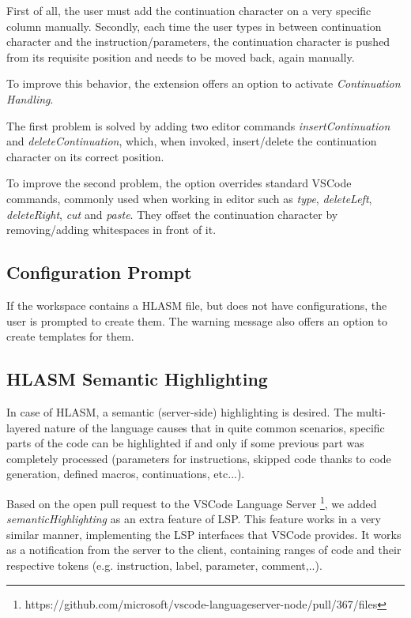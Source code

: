 First of all, the user must add the continuation character on a very specific column manually. Secondly, each time the user types in between continuation character and the instruction/parameters, the continuation character is pushed from its requisite position and needs to be moved back, again manually.

To improve this behavior, the extension offers an option to activate \emph{Continuation Handling}. 

The first problem is solved by adding two editor commands \emph{insertContinuation} and \emph{deleteContinuation}, which, when invoked, insert/delete the continuation character on its correct position.

To improve the second problem, the option overrides standard VSCode commands, commonly used when working in editor such as \emph{type}, \emph{deleteLeft}, \emph{deleteRight}, \emph{cut} and \emph{paste}. They offset the continuation character by removing/adding whitespaces in front of it.


\subsection{Configuration Prompt}

If the workspace contains a HLASM file, but does not have configurations, the user is prompted to create them. The warning message also offers an option to create templates for them.

\subsection{HLASM Semantic Highlighting}

In case of HLASM, a semantic (server-side) highlighting is desired. The multi-layered nature of the language causes that in quite common scenarios, specific parts of the code can be highlighted if and only if some previous part was completely processed (parameters for instructions, skipped code thanks to code generation, defined macros, continuations, etc...).

Based on the open pull request to the VSCode Language Server \footnote{https://github.com/microsoft/vscode-languageserver-node/pull/367/files}, we added \emph{semanticHighlighting} as an extra feature of LSP. This feature works in a very similar manner, implementing the LSP interfaces that VSCode provides. It works as a notification from the server to the client, containing ranges of code and their respective tokens (e.g. instruction, label, parameter, comment,..). 

